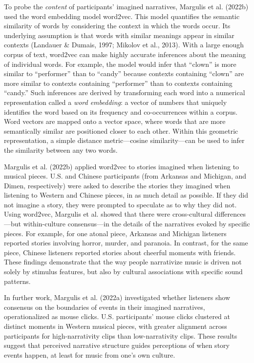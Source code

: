 \documentclass[12pt,twoside]{reedthesis}
\begin{document}
To probe the \emph{content} of participants’ imagined narratives, Margulis et al. (2022b) used the word embedding model word2vec. This model quantifies the semantic similarity of words by considering the context in which the words occur. Its underlying assumption is that words with similar meanings appear in similar contexts (Landauer \& Dumais, 1997; Mikolov et al., 2013). With a large enough corpus of text, word2vec can make highly accurate inferences about the meaning of individual words. For example, the model would infer that “clown” is more similar to “performer” than to “candy” because contexts containing “clown” are more similar to contexts containing “performer” than to contexts containing “candy.” Such inferences are derived by transforming each word into a numerical representation called a \emph{word embedding}: a vector of numbers that uniquely identifies the word based on its frequency and co-occurrences within a corpus. Word vectors are mapped onto a vector space, where words that are more semantically similar are positioned closer to each other. Within this geometric representation, a simple distance metric—cosine similarity—can be used to infer the similarity between any two words. 

Margulis et al. (2022b) applied word2vec to stories imagined when listening to musical pieces. U.S. and Chinese participants (from Arkansas and Michigan, and Dimen, respectively) were asked to describe the stories they imagined when listening to Western and Chinese pieces, in as much detail as possible. If they did not imagine a story, they were prompted to speculate as to why they did not. Using word2vec, Margulis et al. showed that there were cross-cultural differences—but within-culture consensus—in the details of the narratives evoked by specific pieces. For example, for one atonal piece, Arkansas and Michigan listeners reported stories involving horror, murder, and paranoia. In contrast, for the same piece, Chinese listeners reported stories about cheerful moments with friends. These findings demonstrate that the way people narrativize music is driven not solely by stimulus features, but also by cultural associations with specific sound patterns. 

In further work, Margulis et al. (2022a) investigated whether listeners show consensus on the boundaries of events in their imagined narratives, operationalized as mouse clicks. U.S. participants’ mouse clicks clustered at distinct moments in Western musical pieces, with greater alignment across participants for high-narrativity clips than low-narrativity clips. These results suggest that perceived narrative structure guides perceptions of when story events happen, at least for music from one’s own culture.
\end{document}
